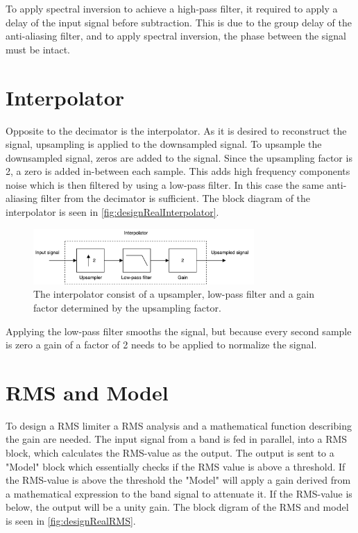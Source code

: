 To apply spectral inversion to achieve a high-pass filter, it required to apply a delay of the input signal before subtraction. This is due to the group delay of the anti-aliasing filter, and to apply spectral inversion, the phase between the signal must be intact.


\section{Interpolator}

Opposite to the decimator is the interpolator. As it is desired to reconstruct the signal, upsampling is applied to the downsampled signal. To upsample the downsampled signal, zeros are added to the signal. Since the upsampling factor is 2, a zero is added in-between each sample. This adds high frequency components noise which is then filtered by using a low-pass filter. In this case the same anti-aliasing filter from the decimator is sufficient. The block diagram of the interpolator is seen in \autoref{fig:designRealInterpolator}.

\begin{figure}[H]
\centering
\includegraphics[width=0.75\textwidth]{figures/designRealInterpolator.pdf}
\caption{The interpolator consist of a upsampler, low-pass filter and a gain factor determined by the upsampling factor.}
\label{fig:designRealInterpolator}
\end{figure}

Applying the low-pass filter smooths the signal, but because every second sample is zero a gain of a factor of 2 needs to be applied to normalize the signal.


\section{RMS and Model}

To design a RMS limiter a RMS analysis and a mathematical function describing the gain are needed. The input signal from a band is fed in parallel, into a RMS block, which calculates the RMS-value as the output. The output is sent to a "Model" block which essentially checks if the RMS value is above a threshold. If the RMS-value is above the threshold the "Model" will apply a gain derived from a mathematical expression to the band signal to attenuate it. If the RMS-value is below, the output will be a unity gain. The block digram of the RMS and model is seen in \autoref{fig:designRealRMS}.

